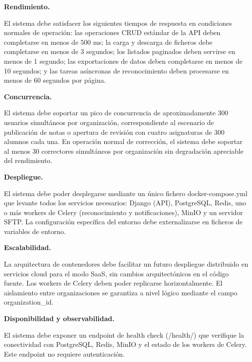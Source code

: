 \begin{nonfunctional}

  \item \textbf{Rendimiento.}

  El sistema debe satisfacer los siguientes tiempos de respuesta en condiciones normales de operación: las operaciones CRUD estándar de la API deben completarse en menos de 500 ms; la carga y descarga de ficheros debe completarse en menos de 3 segundos; los listados paginados deben servirse en menos de 1 segundo; las exportaciones de datos deben completarse en menos de 10 segundos; y las tareas asíncronas de reconocimiento deben procesarse en menos de 60 segundos por página.

  \item \textbf{Concurrencia.}

  El sistema debe soportar un pico de concurrencia de aproximadamente 300 usuarios simultáneos por organización, correspondiente al escenario de publicación de notas o apertura de revisión con cuatro asignaturas de 300 alumnos cada una. En operación normal de corrección, el sistema debe soportar al menos 30 correctores simultáneos por organización sin degradación apreciable del rendimiento.

  \item \textbf{Despliegue.}

  El sistema debe poder desplegarse mediante un único fichero docker-compose.yml que levante todos los servicios necesarios: Django (API), PostgreSQL, Redis, uno o más workers de Celery (reconocimiento y notificaciones), MinIO y un servidor SFTP. La configuración específica del entorno debe externalizarse en ficheros de variables de entorno.

  \item \textbf{Escalabilidad.}

  La arquitectura de contenedores debe facilitar un futuro despliegue distribuido en servicios cloud para el modo SaaS, sin cambios arquitectónicos en el código fuente. Los workers de Celery deben poder replicarse horizontalmente. El aislamiento entre organizaciones se garantiza a nivel lógico mediante el campo organization\_id.

  \item \textbf{Disponibilidad y observabilidad.}

  El sistema debe exponer un endpoint de health check (/health/) que verifique la conectividad con PostgreSQL, Redis, MinIO y el estado de los workers de Celery. Este endpoint no requiere autenticación.


\end{nonfunctional}
